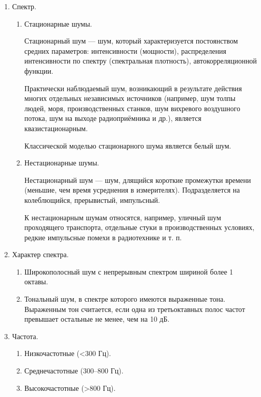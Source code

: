 \begin{enumerate}
	\item Спектр.
		\begin{enumerate}
			\item Стационарные шумы.
			
			Стационарный шум --- шум, который характеризуется постоянством средних параметров: интенсивности (мощности), распределения интенсивности по спектру (спектральная плотность), автокорреляционной функции.
			
			Практически наблюдаемый шум, возникающий в результате действия многих отдельных независимых источников (например, шум толпы людей, моря, производственных станков, шум вихревого воздушного потока, шум на выходе радиоприёмника и др.), является квазистационарным.
			
			Классической моделью стационарного шума является белый шум.
			
			\item Нестационарные шумы.
			
			Нестационарный шум --- шум, длящийся короткие промежутки времени (меньшие, чем время усреднения в измерителях). Подразделяется на колеблющийся, прерывистый, импульсный.
			
			К нестационарным шумам относятся, например, уличный шум проходящего транспорта, отдельные стуки в производственных условиях, редкие импульсные помехи в радиотехнике и т. п.					
		\end{enumerate}
	
	\item Характер спектра.
		\begin{enumerate}
			\item Широкополосный шум с непрерывным спектром шириной более 1 октавы.
			\item Тональный шум, в спектре которого имеются выраженные тона. Выраженным тон считается, если одна из третьоктавных полос частот превышает остальные не менее, чем на 10 дБ.								
		\end{enumerate}
	

	
	\item Частота.
		\begin{enumerate}
			\item Низкочастотные (<300 Гц).
			\item Среднечастотные (300--800 Гц).
			\item Высокочастотные (>800 Гц).					
		\end{enumerate}
	

\end{enumerate}
